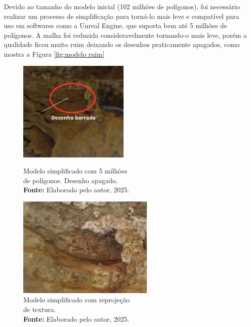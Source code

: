 Devido ao tamanho do modelo inicial (102 milhões de polígonos), foi necessário realizar um processo de simplificação para torná-lo mais leve e compatível para uso em softwares como a Unreal Engine, que suporta bem até 5 milhões de polígonos. A malha foi reduzida consideravelmente tornando-o mais leve, porém a qualidade ficou muito ruim deixando os desenhos praticamente apagados, como mostra a Figura \ref{fig:modelo ruim}

\begin{figure}[H]
    \centering
    \begin{minipage}{0.45\textwidth} %
        \centering
        \includegraphics[height=5cm, keepaspectratio]{img/reality e fotogrametria processo/modelo ruim.png}
        \caption{Modelo simplificado com 5 milhões \\ de polígonos. Desenho apagado. \\
            \textbf{Fonte:} Elaborado pelo autor, 2025.}
        \label{fig:modelo ruim}
    \end{minipage}
    \hspace{1cm} %
    \begin{minipage}{0.45\textwidth} %
        \centering
        \includegraphics[height=5cm, keepaspectratio]{img/reality e fotogrametria processo/desenho bom retroprojeção.png}
        \caption{Modelo simplificado com reprojeção \\ de textura. \\
            \textbf{Fonte:} Elaborado pelo autor, 2025.}
        \label{fig:desenho bom}
    \end{minipage}
\end{figure}

